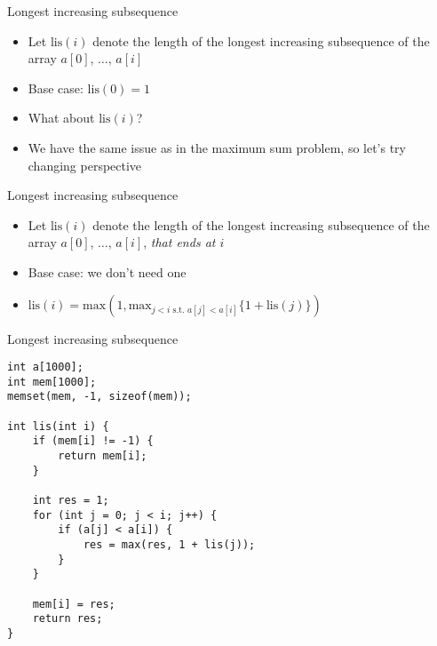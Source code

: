    \begin{frame}[fragile]{Longest increasing subsequence}

    \begin{itemize}
\item Let $\mathrm{lis}(i)$ denote the length of the longest increasing subsequence of the array $a[0]$, $\ldots$, $a[i]$

\item Base case: $\mathrm{lis}(0) = 1$
\item What about $\mathrm{lis}(i)$?
\item We have the same issue as in the maximum sum problem, so let's try changing perspective
    \end{itemize}
\end{frame}

   \begin{frame}[fragile]{Longest increasing subsequence}

    \begin{itemize}
\item Let $\mathrm{lis}(i)$ denote the length of the longest increasing subsequence of the array $a[0]$, $\ldots$, $a[i]$, \textit{that ends at $i$}

\item Base case: we don't need one
\item $\mathrm{lis}(i) = \mathrm{max}(1, \mathrm{max}_{j<i \textrm{ s.t. } a[j] < a[i]} \{ 1 + \mathrm{lis}(j) \})$
    \end{itemize}
\end{frame}

   \begin{frame}[fragile]{Longest increasing subsequence}
    \begin{lstlisting}
int a[1000];
int mem[1000];
memset(mem, -1, sizeof(mem));

int lis(int i) {
    if (mem[i] != -1) {
        return mem[i];
    }

    int res = 1;
    for (int j = 0; j < i; j++) {
        if (a[j] < a[i]) {
            res = max(res, 1 + lis(j));
        }
    }

    mem[i] = res;
    return res;
}
    \end{lstlisting}
\end{frame}


